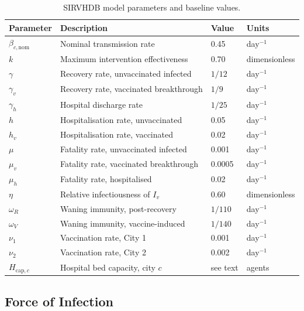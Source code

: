 \begin{table}[ht]
\centering
\caption{SIRVHDB model parameters and baseline values.}
\label{tab:parameters}
\begin{tabular}{@{}llll@{}}
\toprule
\textbf{Parameter} & \textbf{Description} & \textbf{Value} & \textbf{Units} \\
\midrule
$\beta_{c,\mathrm{nom}}$ & Nominal transmission rate             & 0.45     & day$^{-1}$ \\
$k$             & Maximum intervention effectiveness       & 0.70     & dimensionless \\
$\gamma$        & Recovery rate, unvaccinated infected     & $1/12$   & day$^{-1}$ \\
$\gamma_v$      & Recovery rate, vaccinated breakthrough   & $1/9$    & day$^{-1}$ \\
$\gamma_h$      & Hospital discharge rate                  & $1/25$   & day$^{-1}$ \\
$h$             & Hospitalisation rate, unvaccinated       & 0.05     & day$^{-1}$ \\
$h_v$           & Hospitalisation rate, vaccinated         & 0.02     & day$^{-1}$ \\
$\mu$           & Fatality rate, unvaccinated infected     & 0.001    & day$^{-1}$ \\
$\mu_v$         & Fatality rate, vaccinated breakthrough   & 0.0005   & day$^{-1}$ \\
$\mu_h$         & Fatality rate, hospitalised              & 0.02     & day$^{-1}$ \\
$\eta$          & Relative infectiousness of $I_v$         & 0.60     & dimensionless \\
$\omega_R$      & Waning immunity, post-recovery           & $1/110$  & day$^{-1}$ \\
$\omega_V$      & Waning immunity, vaccine-induced         & $1/140$  & day$^{-1}$ \\
$\nu_1$         & Vaccination rate, City 1                 & 0.001    & day$^{-1}$ \\
$\nu_2$         & Vaccination rate, City 2                 & 0.002    & day$^{-1}$ \\
$H_{{\mathrm{cap}},c}$ & Hospital bed capacity, city $c$     & see text & agents \\
\bottomrule
\end{tabular}
\end{table}

\subsection{Force of Infection}
\label{sec:foi}


